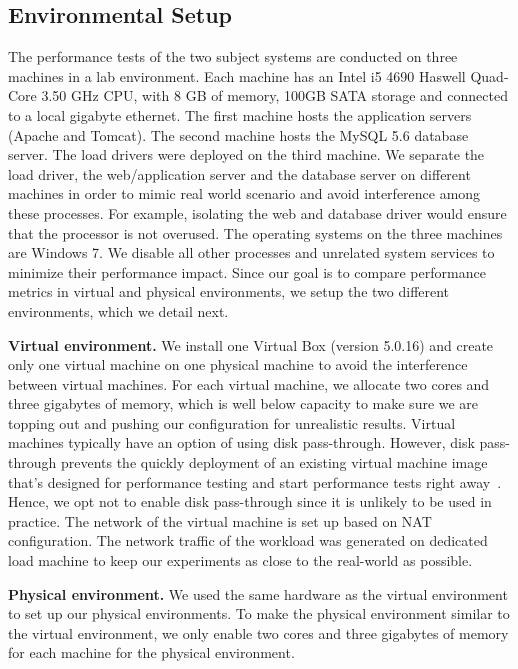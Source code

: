 \documentclass[smallextended]{svjour3}       %
\begin{document}
\subsection{Environmental Setup}

The performance tests of the two subject systems are conducted on three machines in a lab environment. Each machine has an Intel i5 4690 Haswell Quad-Core 3.50 GHz CPU, with 8 GB of memory, 100GB SATA storage and connected to a local gigabyte ethernet. The first machine hosts the application servers (Apache and Tomcat). The second machine hosts the MySQL 5.6 database server. The load drivers were deployed on the third machine. We separate the load driver, the web/application server and the database server on different machines in order to mimic real world scenario and avoid interference among these processes. For example, isolating the web and database driver would ensure that the processor is not overused. The operating systems on the three machines are Windows 7. We disable all other processes and unrelated system services to minimize their performance impact. Since our goal is to compare performance metrics in virtual and physical environments, we setup the two different environments, which we detail next.


\noindent \textbf{Virtual environment.} We install one Virtual Box (version 5.0.16) and create only one virtual machine on one physical machine to avoid the interference between virtual machines. For each virtual machine, we allocate two cores and three gigabytes of memory, which is well below capacity to make sure we are topping out and pushing our configuration for unrealistic results. Virtual machines typically have an option of using disk pass-through\cite{whatisdiskpassthrough}. However, disk pass-through prevents the quickly deployment of an existing virtual machine image that’s designed for performance testing and start performance tests right away~\cite{diskpassthrough}. Hence, we opt not to enable disk pass-through since it is unlikely to be used in practice. The network of the virtual machine is set up based on NAT configuration\cite{NAT_config}. The network traffic of the workload was generated on dedicated load machine to keep our experiments as close to the real-world as possible.


\noindent \textbf{Physical environment.} We used the same hardware as the virtual environment to set up our physical environments. To make the physical environment similar to the virtual environment, we only enable two cores and three gigabytes of memory for each machine for the physical environment. 
\end{document}
